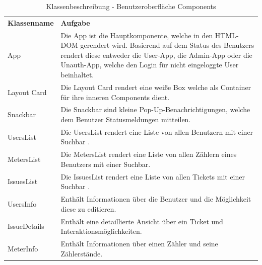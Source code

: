 \begin{table}[H]
	\centering
	\begin{tabularx}{\textwidth}{X X}
	\rowcolor[HTML]{C0C0C0} 
	\textbf{Klassenname} & \textbf{Aufgabe} \\
	App & Die App ist die Hauptkomponente, welche in den HTML-DOM gerendert wird. Basierend auf dem Status des Benutzers rendert diese entweder die User-App, die Admin-App oder die Unauth-App, welche den Login für nicht eingeloggte User beinhaltet. \\
	\rowcolor[HTML]{E7E7E7} 
	Layout Card & Die Layout Card rendert eine weiße Box welche als Container für ihre inneren Components dient.  \\
	Snackbar & Die Snackbar sind kleine Pop-Up-Benachrichtigungen, welche dem Benutzer Statusmeldungen mitteilen.  \\
	\rowcolor[HTML]{E7E7E7} 
	UsersList & Die UsersList rendert eine Liste von allen Benutzern mit einer Suchbar . \\
	MetersList & Die MetersList rendert eine Liste von allen Zählern eines Benutzers mit einer Suchbar. \\
	\rowcolor[HTML]{E7E7E7} 
	IssuesList & Die IssuesList rendert eine Liste von allen Tickets mit einer Suchbar .\\
	UsersInfo & Enthält Informationen über die Benutzer und die Möglichkeit diese zu editieren. \\
	\rowcolor[HTML]{E7E7E7} 
	IssueDetails & Enthält eine detaillierte Ansicht über ein Ticket und Interaktionsmöglichkeiten.\\
	MeterInfo & Enthält Informationen über einen Zähler und seine Zählerstände.
\end{tabularx}
	\caption{Klassenbeschreibung - Benutzeroberfläche Components}
	\label{table:klassenbeschreibung-ui}
\end{table}
